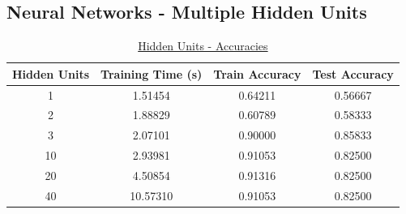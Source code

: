\documentclass[12pt]{article}
\begin{document}
\subsection*{Neural Networks - Multiple Hidden Units}
\begin{table}[h!]
\begin{center}
\caption{\underline{Hidden Units - Accuracies}}
\vspace{1mm}
\label{tab:table6}
\begin{tabular}{|c|c|c|c|}
\hline
\textbf{Hidden Units} & \textbf{Training Time (s)} & \textbf{Train Accuracy} & \textbf{Test Accuracy} \\
\hline
1 & 1.51454 & 0.64211 & 0.56667 \\
2 & 1.88829 & 0.60789 & 0.58333 \\
3 & 2.07101 & 0.90000 & 0.85833 \\
10 & 2.93981 & 0.91053 & 0.82500 \\
20 & 4.50854 & 0.91316 & 0.82500 \\
40 & 10.57310 & 0.91053 & 0.82500 \\
\hline
\end{tabular}
\end{center}
\end{table}
\end{document}
